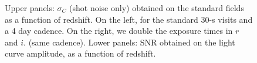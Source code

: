 \documentclass[\docopts]{\docclass}
\begin{document}
\begin{figure}
\begin{center}
\end{center}
\caption{Upper panels: $\sigma_C$ (shot noise only) obtained on the
  standard fields as a function of redshift.  On the left, for the
  standard 30-s visits and a 4 day cadence. On the right, we double
  the exposure times in $r$ and $i$.  (same cadence).  Lower panels:
  SNR obtained on the light curve amplitude, as a function of
  redshift.}
\label{fig:sigc_vs_z_4_day_cadence_wide}
\end{figure}
\end{document}
